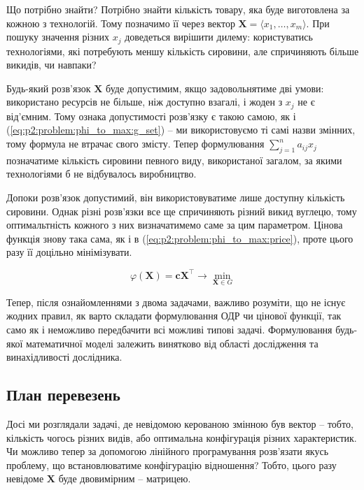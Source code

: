 \documentclass[\main/book.tex]{subfiles}
\begin{document}
Що потрібно знайти? Потрібно знайти кількість товару, яка буде виготовлена за кожною з технологій. Тому позначимо її через вектор $\mathbf{X} = \langle x_1, \ldots, x_m \rangle$. При пошуку значення різних $x_j$ доведеться вирішити дилему: користуватись технологіями, які потребують меншу кількість сировини, але спричиняють більше викидів, чи навпаки?

Будь-який розв'язок $\mathbf{X}$ буде допустимим, якщо задовольнятиме дві умови: використано ресурсів не більше, ніж доступно взагалі, і жоден з $x_j$ не є від'ємним. Тому ознака допустимості розв'язку є такою самою, як і (\ref{eq:p2:problem:phi_to_max:g_set}) -- ми використовуємо ті самі назви змінних, тому формула не втрачає свого змісту. Тепер формулювання ${\sum_{j=1}^n a_{ij} x_j}$ позначатиме кількість сировини певного виду, використаної загалом, за якими технологіями б не відбувалось виробництво.

Допоки розв'язок допустимий, він використовуватиме лише дос\-туп\-ну кількість сировини. Однак різні розв'язки все ще спричиняють різний викид вуглецю, тому оптимальтність кожного з них визначатимемо саме за цим параметром. Цінова функція знову така сама, як і в (\ref{eq:p2:problem:phi_to_max:price}), проте цього разу її доцільно мінімізувати.

\begin{equation}
 \varphi(\mathbf{X}) =
 \mathbf{c} \mathbf{X}^\top
 \rightarrow \min_{\mathbf{X} \in G}
\end{equation}

\begin{note}
Тепер, після ознайомленнями з двома задачами, важливо розуміти, що не існує жодних правил, як варто складати формулювання ОДР чи цінової функції, так само як і неможливо передбачити всі можливі \flqq{}типові задачі\frqq{}. Формулювання будь-якої математичної моделі залежить винятково від області дослідження та винахідливості дослідника.
\end{note}

\subsection{План перевезень}
\label{subsection:linear:transportation_problem}

Досі ми розглядали задачі, де невідомою керованою змінною був вектор -- тобто, кількість чогось різних видів, або оптимальна конфігурація різних характеристик. Чи можливо тепер за допомогою лінійного програмування розв'язати якусь проблему, що встановлюватиме конфігурацію відношення? Тобто, цього разу невідоме $\mathbf{X}$ буде двовимірним -- матрицею.
\end{document}
